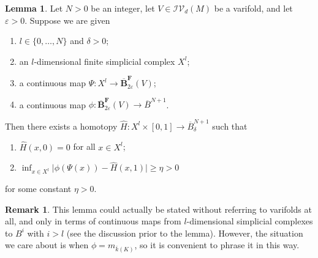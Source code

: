 \documentclass[12pt,english]{article}
\theoremstyle{definition}
\newtheorem{lemma}[theorem]{Lemma}
\newtheorem{remark}[theorem]{Remark}
\begin{document}
\begin{lemma}\label{unsthomotopy}
Let $N>0$ be an integer, let $V\in\mathcal{IV}_d(M)$ be a varifold, and let $\varepsilon>0$. Suppose we are given
\begin{enumerate}
    \item $l\in\{0,\dots,N\}$ and $\delta>0$;
    \item an $l$-dimensional finite simplicial complex $X^l$;
    \item a continuous map $\Psi:X^l\rightarrow \overline{\mathbf{B}}^\mathbf{F}_{2\varepsilon}(V)$;
    \item a continuous map $\phi:\overline{\mathbf{B}}^\mathbf{F}_{2\varepsilon}(V)\rightarrow \overline{B}^{N+1}$.
\end{enumerate}
Then there exists a homotopy $\hat H:X^l\times[0,1]\rightarrow \overline B^{N+1}_\delta$ such that
\begin{enumerate}
    \item $\hat H(x,0)=0$ for all $x\in X^l$;
    \item $\inf_{x\in X^l}\bigl|\phi(\Psi(x))-\hat H(x,1)\bigr|\geq \eta>0$
\end{enumerate}
for some constant $\eta>0$.
\end{lemma}
\begin{remark}
    This lemma could actually be stated without referring to varifolds at all, and only in terms of continuous maps from $l$-dimensional simplicial complexes to $B^{i}$ with $i>l$ (see the discussion prior to the lemma). However, the situation we care about is when $\phi=m_{\bar k(K)}$, so it is convenient to phrase it in this way.
\end{remark}
\end{document}
